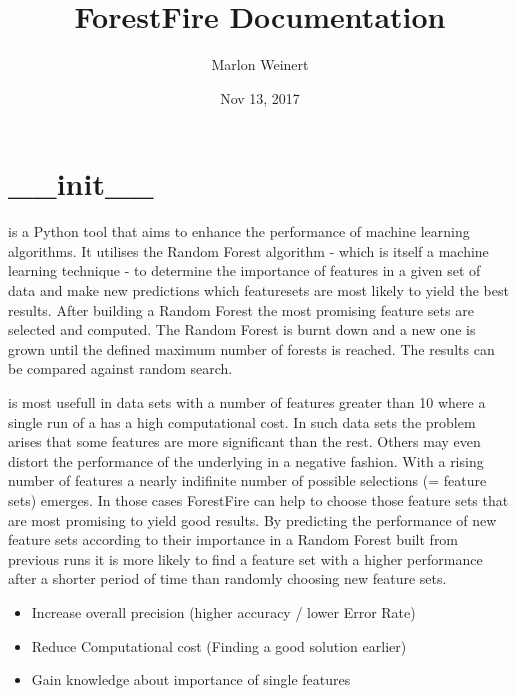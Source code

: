 \documentclass[letterpaper,10pt,english]{sphinxmanual}
\title{ForestFire Documentation}
\date{Nov 13, 2017}
\author{Marlon Weinert}
\begin{document}
\maketitle
\sphinxtableofcontents
{}\label{\detokenize{index::doc}}



\chapter{\_\_init\_\_}
\label{\detokenize{index:init}}\label{\detokenize{index:module-ForestFire}}\label{\detokenize{index:forestfire}}
 is a Python tool that aims to enhance the performance of machine learning algorithms. 
It utilises the Random Forest algorithm - which is itself a machine learning technique - to determine the 
importance of features in a given set of data and make new predictions which featuresets are most 
likely to yield the best results. 
After building a Random Forest the most promising feature sets are selected and computed. 
The Random Forest is burnt down and a new one is grown until the defined maximum number of forests is reached.
The results can be compared against random search.

 is most usefull in data sets with a number of features greater than 10 where a single run of
a {\hyperref[\detokenize{Overview:mla}]{}} has a high computational cost. In such data sets the problem arises that some features are
more significant than the rest.
Others may even distort the performance of the underlying {\hyperref[\detokenize{Overview:mla}]{}} in a negative fashion. 
With a rising number of features a nearly indifinite number of possible selections (= feature sets) emerges.
In those cases ForestFire can help to choose those feature sets that are most promising to yield good results.
By predicting the performance of new feature sets according to their importance in a Random Forest built 
from previous runs it is more likely to find a feature set with a higher performance after a shorter period 
of time than randomly choosing new feature sets.

\begin{itemize}
\item {} 
Increase overall precision (higher accuracy / lower Error Rate)

\item {} 
Reduce Computational cost (Finding a good solution earlier)

\item {} 
Gain knowledge about importance of single features

\end{itemize}
\end{document}
